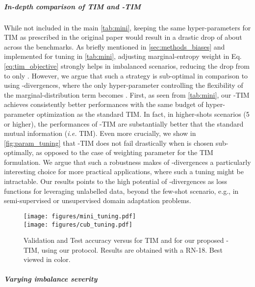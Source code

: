         \subparagraph{In-depth comparison of TIM and -TIM }
While not included in the main \autoref{tab:mini}, keeping the same hyper-parameters for TIM as prescribed in the original paper \cite{malik2020Tim} would result in a 
        drastic drop of about  across the benchmarks. As briefly mentioned in \autoref{sec:methods_biases} and implemented for tuning \cite{malik2020Tim} in \autoref{tab:mini}, adjusting marginal-entropy weight  in Eq. \eqref{eq:tim_objective} strongly helps in imbalanced scenarios, reducing the drop from  to only . However, we argue that such a strategy is sub-optimal in comparison to using -divergences, where the only hyper-parameter controlling the flexibility of the marginal-distribution term becomes . 
        First, as seen from \autoref{tab:mini}, our -TIM achieves consistently better performances with the same budget of hyper-parameter optimization as the standard TIM.
        In fact, in higher-shots scenarios (5 or higher), the performances of -TIM are substantially better that the standard mutual information (\textit{i.e.} TIM). Even more crucially, we
        show in \autoref{fig:param_tuning} that -TIM does not fail drastically when  is chosen sub-optimally, as opposed to the case of weighting parameter  for the TIM formulation. We argue that such a robustness makes of -divergences a particularly interesting choice for more practical applications, where such a tuning might
        be intractable. Our results points to the high potential of -divergences as loss functions for leveraging unlabelled data, beyond the few-shot scenario, e.g., in semi-supervised or unsupervised domain adaptation problems.
        
        \begin{figure}[h]
            \centering
                \texttt{[image: figures/mini\_tuning.pdf]} \\
                \texttt{[image: figures/cub\_tuning.pdf]} \\
            \caption{Validation and Test accuracy versus  for TIM \cite{malik2020Tim} and  for our proposed -TIM, using our protocol. 
            Results are obtained with a RN-18. 
Best viewed in color.}
            \label{fig:param_tuning}
        \end{figure}

        \subparagraph{Varying imbalance severity}

